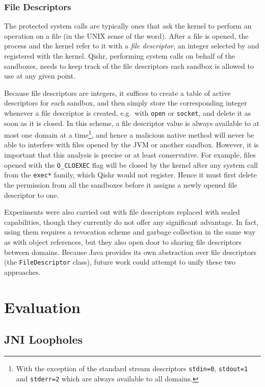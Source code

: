 \documentclass[a4paper,12pt,twoside,openright]{report}
\newcommand{\class}[1]{\texttt{#1}}
\begin{document}
\subsection{File Descriptors}

The protected system calls are typically ones that ask the kernel to perform an operation on a file (in the UNIX sense of the word). After a file is opened, the process and the kernel refer to it with a \emph{file descriptor}, an integer selected by and registered with the kernel. Qishr, performing system calls on behalf of the sandboxes, needs to keep track of the file descriptors each sandbox is allowed to use at any given point.

Because file descriptors are integers, it suffices to create a table of active descriptors for each sandbox, and then simply store the corresponding integer whenever a file descriptor is created, e.g.\ with \texttt{open} or \texttt{socket}, and delete it as soon as it is closed. In this scheme, a file descriptor value is always available to at most one domain at a time\footnote{With the exception of the standard stream descriptors \texttt{stdin=0}, \texttt{stdout=1} and \texttt{stderr=2} which are always available to all domains.}, and hence a malicious native method will never be able to interfere with files opened by the JVM or another sandbox. However, it is important that this analysis is precise or at least conservative. For example, files opened with the \texttt{O\_CLOEXEC} flag will be closed by the kernel after any system call from the \texttt{exec*} family, which Qishr would not register. Hence it must first delete the permission from all the sandboxes before it assigns a newly opened file descriptor to one.

Experiments were also carried out with file descriptors replaced with sealed capabilities, though they currently do not offer any significant advantage. In fact, using them requires a revocation scheme and garbage collection in the same way as with object references, but they also open door to sharing file descriptors between domains. Because Java provides its own abstraction over file descriptors (the \class{FileDescriptor} class), future work could attempt to unify these two approaches.

\chapter{Evaluation} 

\section{JNI Loopholes}
\end{document}
